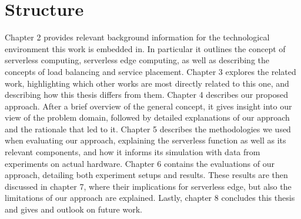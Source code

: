 \section{Structure}
Chapter 2 provides relevant background information for the technological environment this work is embedded in. In particular it outlines the concept of serverless computing, serverless edge computing, as well as describing the concepts of load balancing and service placement.
Chapter 3 explores the related work, highlighting which other works are most directly related to this one, and describing how this thesis differs from them.
Chapter 4 describes our proposed approach. After a brief overview of the general concept, it gives insight into our view of the problem domain, followed by detailed explanations of our approach and the rationale that led to it.
Chapter 5 describes the methodologies we used when evaluating our approach, explaining the serverless function as well as its relevant components, and how it informs its simulation with data from experiments on actual hardware.
Chapter 6 contains the evaluations of our approach, detailing both experiment setups and results.
These results are then discussed in chapter 7, where their implications for serverless edge, but also the limitations of our approach are explained.
Lastly, chapter 8 concludes this thesis and gives and outlook on future work.



